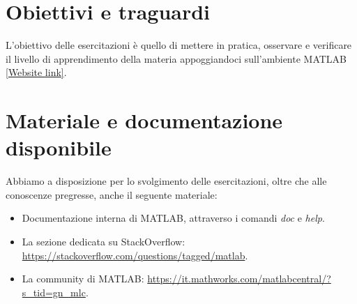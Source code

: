\section{Obiettivi e traguardi}
L'obiettivo delle esercitazioni è quello di mettere in pratica, osservare e verificare il livello di apprendimento della materia appoggiandoci sull'ambiente MATLAB \href{https://it.mathworks.com/products/matlab.html}{[Website link]}.

\section{Materiale e documentazione disponibile}
Abbiamo a disposizione per lo svolgimento delle esercitazioni, oltre che alle conoscenze pregresse, anche il seguente materiale:
\begin{itemize}
    \item Documentazione interna di MATLAB, attraverso i comandi \textit{doc} e \textit{help}.
    \item La sezione dedicata su StackOverflow: \url{https://stackoverflow.com/questions/tagged/matlab}.
    \item La community di MATLAB: \url{https://it.mathworks.com/matlabcentral/?s_tid=gn_mlc}.
\end{itemize}